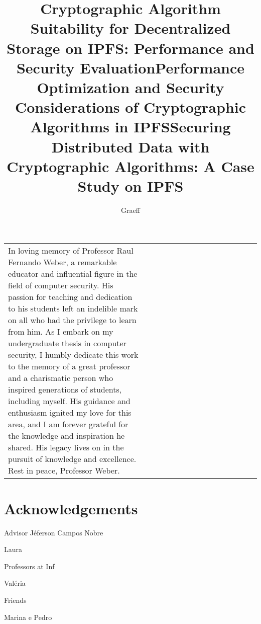 \documentclass[cic,tc,english]{iiufrgs}
\title{Cryptographic Algorithm Suitability for Decentralized Storage on IPFS: Performance and Security Evaluation}
\title{Performance Optimization and Security Considerations of Cryptographic Algorithms in IPFS}
\title{Securing Distributed Data with Cryptographic Algorithms: A Case Study on IPFS}
\author{Graeff}{Felipe de Almeida}
\begin{document}
\maketitle

\clearpage
\begin{flushright}
    \mbox{}\vfill
    \begin{tabular}{p{0.55\linewidth} p{0.45\linewidth}}
      In loving memory of Professor Raul Fernando Weber, a remarkable educator and influential figure in the field of computer security. His passion for teaching and dedication to his students left an indelible mark on all who had the privilege to learn from him. As I embark on my undergraduate thesis in computer security, I humbly dedicate this work to the memory of a great professor and a charismatic person who inspired generations of students, including myself. His guidance and enthusiasm ignited my love for this area, and I am forever grateful for the knowledge and inspiration he shared. His legacy lives on in the pursuit of knowledge and excellence. Rest in peace, Professor Weber.\\
    \end{tabular}
\end{flushright}

\chapter*{Acknowledgements}
Advisor Jéferson Campos Nobre

Laura

Professors at Inf

Valéria

Friends

Marina e Pedro

\end{document}
